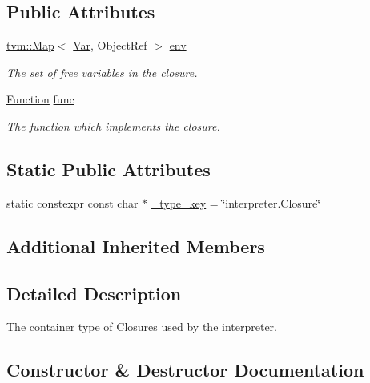 \subsection*{Public Attributes}
\begin{DoxyCompactItemize}
\item 
\hyperlink{classtvm_1_1Map}{tvm\+::\+Map}$<$ \hyperlink{classtvm_1_1relay_1_1Var}{Var}, Object\+Ref $>$ \hyperlink{classtvm_1_1relay_1_1InterpreterClosureObj_a159f46324e99dc7ddd4ee8c78fa5cd3c}{env}
\begin{DoxyCompactList}\small\item\em The set of free variables in the closure. \end{DoxyCompactList}\item 
\hyperlink{classtvm_1_1relay_1_1Function}{Function} \hyperlink{classtvm_1_1relay_1_1InterpreterClosureObj_a698f143669d058321f53cb31a08982cd}{func}
\begin{DoxyCompactList}\small\item\em The function which implements the closure. \end{DoxyCompactList}\end{DoxyCompactItemize}
\subsection*{Static Public Attributes}
\begin{DoxyCompactItemize}
\item 
static constexpr const char $\ast$ \hyperlink{classtvm_1_1relay_1_1InterpreterClosureObj_ad316131843a237abf592b009d839c7bb}{\+\_\+type\+\_\+key} = \char`\"{}interpreter.\+Closure\char`\"{}
\end{DoxyCompactItemize}
\subsection*{Additional Inherited Members}


\subsection{Detailed Description}
The container type of Closures used by the interpreter. 

\subsection{Constructor \& Destructor Documentation}
